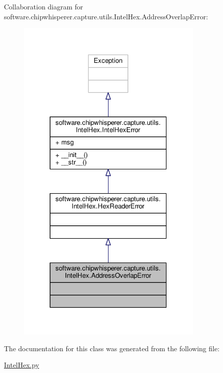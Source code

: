 Collaboration diagram for software.\+chipwhisperer.\+capture.\+utils.\+Intel\+Hex.\+Address\+Overlap\+Error\+:\nopagebreak
\begin{figure}[H]
\begin{center}
\leavevmode
\includegraphics[width=256pt]{d5/de0/classsoftware_1_1chipwhisperer_1_1capture_1_1utils_1_1IntelHex_1_1AddressOverlapError__coll__graph}
\end{center}
\end{figure}


The documentation for this class was generated from the following file\+:\begin{DoxyCompactItemize}
\item 
\hyperlink{IntelHex_8py}{Intel\+Hex.\+py}\end{DoxyCompactItemize}

